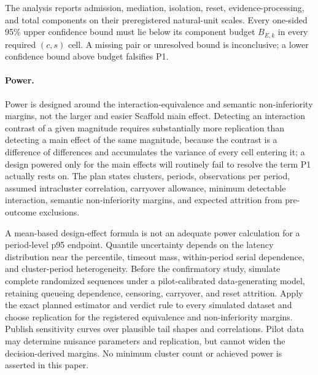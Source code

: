\documentclass[11pt]{article}
\begin{document}
The analysis reports admission, mediation, isolation, reset, evidence-processing, and total components on their preregistered natural-unit scales. Every one-sided 95\% upper confidence bound must lie below its component budget $B_{E,k}$ in every required $(c,s)$ cell. A missing pair or unresolved bound is inconclusive; a lower confidence bound above budget falsifies P1.

\paragraph{Power.}
Power is designed around the interaction-equivalence and semantic non-inferiority margins, not the larger and easier Scaffold main effect. Detecting an interaction contrast of a given magnitude requires substantially more replication than detecting a main effect of the same magnitude, because the contrast is a difference of differences and accumulates the variance of every cell entering it; a design powered only for the main effects will routinely fail to resolve the term P1 actually rests on. The plan states clusters, periods, observations per period, assumed intracluster correlation, carryover allowance, minimum detectable interaction, semantic non-inferiority margins, and expected attrition from pre-outcome exclusions.

A mean-based design-effect formula is not an adequate power calculation for a period-level p95 endpoint. Quantile uncertainty depends on the latency distribution near the percentile, timeout mass, within-period serial dependence, and cluster-period heterogeneity. Before the confirmatory study, simulate complete randomized sequences under a pilot-calibrated data-generating model, retaining queueing dependence, censoring, carryover, and reset attrition. Apply the exact planned estimator and verdict rule to every simulated dataset and choose replication for the registered equivalence and non-inferiority margins. Publish sensitivity curves over plausible tail shapes and correlations. Pilot data may determine nuisance parameters and replication, but cannot widen the decision-derived margins. No minimum cluster count or achieved power is asserted in this paper.
\end{document}
